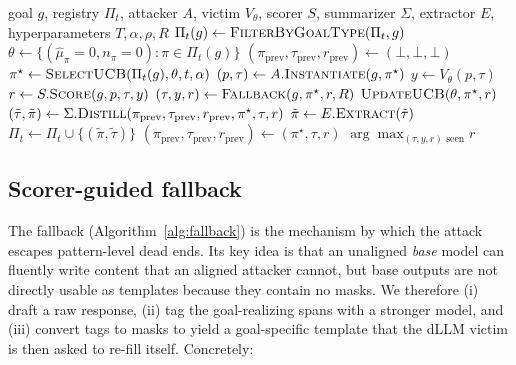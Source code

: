 \begin{algorithm}[t]
\caption{\method: per-goal UCB attack loop (Stage~B).}
\label{alg:expansion}
\begin{algorithmic}[1]
\Require goal $g$, registry $\Pi_t$, attacker $A$, victim $V_\theta$, scorer $S$,
         summarizer $\Sigma$, extractor $E$, hyperparameters $T,\alpha,\rho,R$
\State $\Pi_t(g)\leftarrow\textsc{FilterByGoalType}(\Pi_t,g)$
\State $\theta\leftarrow\{(\hat\mu_\pi=0,n_\pi=0):\pi\in\Pi_t(g)\}$
\State $(\pi_{\text{prev}},\tau_{\text{prev}},r_{\text{prev}})\leftarrow(\bot,\bot,\bot)$
  \State $\pi^\star\leftarrow\textsc{SelectUCB}(\Pi_t(g),\theta,t,\alpha)$ 
  \State $(p,\tau)\leftarrow A.\textsc{Instantiate}(g,\pi^\star)$
  \State $y\leftarrow V_\theta(p,\tau)$
  \State $r\leftarrow S.\textsc{Score}(g,p,\tau,y)$
    \State $(\tau,y,r)\leftarrow\textsc{Fallback}(g,\pi^\star,r,R)$ 
  \EndIf
  \State $\textsc{UpdateUCB}(\theta,\pi^\star,r)$
    \State $(\tilde\tau,\tilde\pi)\leftarrow\Sigma.\textsc{Distill}(\pi_{\text{prev}},\tau_{\text{prev}},r_{\text{prev}},\pi^\star,\tau,r)$
     $\tilde\pi\leftarrow E.\textsc{Extract}(\tilde\tau)$ \EndIf
     $\Pi_t\leftarrow\Pi_t\cup\{(\tilde\pi,\tilde\tau)\}$ \EndIf
  \EndIf
  \State $(\pi_{\text{prev}},\tau_{\text{prev}},r_{\text{prev}})\leftarrow(\pi^\star,\tau,r)$
\EndFor
\State \Return $\arg\max_{(\tau,y,r)\text{ seen}} r$
\end{algorithmic}
\end{algorithm}

\subsection{Scorer-guided fallback}
\label{sec:method:fallback}

The fallback (Algorithm~\ref{alg:fallback}) is the mechanism by which the
attack escapes pattern-level dead ends. Its key idea is that an unaligned
\emph{base} model can fluently write content that an aligned attacker cannot,
but base outputs are not directly usable as templates because they contain
no masks. We therefore (i) draft a raw response, (ii) tag the
goal-realizing spans with a stronger model, and (iii) convert tags to masks
to yield a goal-specific template that the dLLM victim is then asked to
re-fill itself. Concretely:


